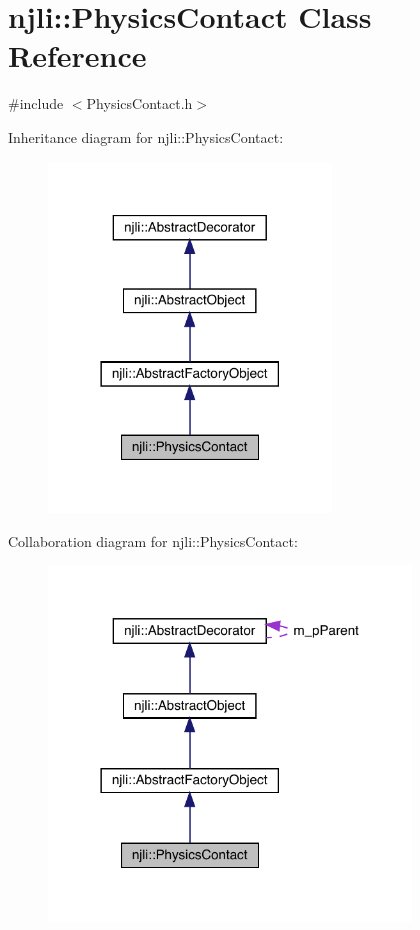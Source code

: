 \hypertarget{classnjli_1_1_physics_contact}{}\section{njli\+:\+:Physics\+Contact Class Reference}
\label{classnjli_1_1_physics_contact}


{\ttfamily \#include $<$Physics\+Contact.\+h$>$}



Inheritance diagram for njli\+:\+:Physics\+Contact\+:\nopagebreak
\begin{figure}[H]
\begin{center}
\leavevmode
\includegraphics[width=213pt]{classnjli_1_1_physics_contact__inherit__graph}
\end{center}
\end{figure}


Collaboration diagram for njli\+:\+:Physics\+Contact\+:\nopagebreak
\begin{figure}[H]
\begin{center}
\leavevmode
\includegraphics[width=273pt]{classnjli_1_1_physics_contact__coll__graph}
\end{center}
\end{figure}
